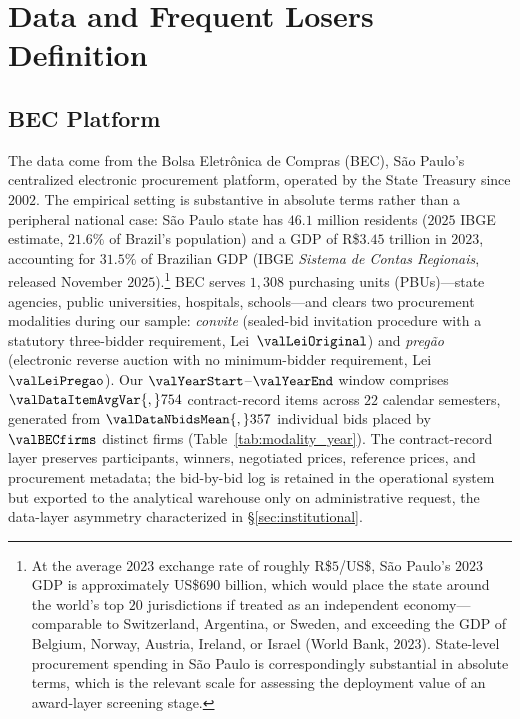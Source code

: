 \section{Data and Frequent Losers Definition}
\label{sec:data}

\subsection{BEC Platform}
\label{sec:data_bec}

The data come from the Bolsa Eletr\^onica de Compras (BEC), São
Paulo's centralized electronic procurement platform, operated by
the State Treasury since $2002$. The empirical setting is
substantive in absolute terms rather than a peripheral national
case: São Paulo state has $46.1$ million residents
($2025$ IBGE estimate, $21.6\%$ of Brazil's population) and a
GDP of R\$$3.45$ trillion in $2023$, accounting for $31.5\%$
of Brazilian GDP (IBGE \emph{Sistema de Contas Regionais},
released November $2025$).\footnote{At the average $2023$
exchange rate of roughly R\$$5$/US\$, São Paulo's $2023$ GDP is
approximately US\$$690$ billion, which would place the state
around the world's top $20$ jurisdictions if treated as an
independent economy---comparable to Switzerland, Argentina, or
Sweden, and exceeding the GDP of Belgium, Norway, Austria,
Ireland, or Israel (World Bank, $2023$). State-level procurement
spending in São Paulo is correspondingly substantial in absolute
terms, which is the relevant scale for assessing the deployment
value of an award-layer screening stage.} BEC serves $1{,}308$
purchasing units (PBUs)---state agencies, public universities,
hospitals, schools---and clears two procurement modalities during
our sample:
\emph{convite} (sealed-bid invitation procedure with a
statutory three-bidder requirement, Lei~$\valLeiOriginal$) and
\emph{preg\~ao} (electronic reverse auction with no minimum-bidder
requirement, Lei~$\valLeiPregao$). Our $\valYearStart$--$\valYearEnd$
window comprises $\valDataItemAvgVar{,}754$ contract-record items
across $22$ calendar semesters, generated from
$\valDataNbidsMean{,}357$ individual bids placed by $\valBECfirms$
distinct firms (Table~\ref{tab:modality_year}). The contract-record
layer preserves participants, winners, negotiated prices, reference
prices, and procurement metadata; the bid-by-bid log is retained
in the operational system but exported to the analytical warehouse
only on administrative request, the data-layer asymmetry
characterized in §\ref{sec:institutional}.

